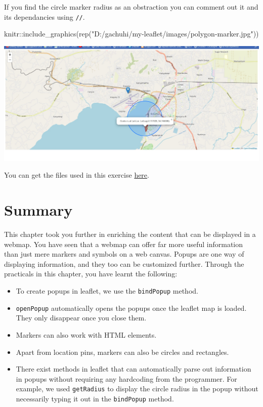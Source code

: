 \documentclass[
]{book}
\newenvironment{Shaded}{\begin{snugshade}}{\end{snugshade}}
\newcommand{\FunctionTok}[1]{\textcolor[rgb]{0.00,0.00,0.00}{#1}}
\newcommand{\NormalTok}[1]{#1}
\newcommand{\SpecialCharTok}[1]{\textcolor[rgb]{0.00,0.00,0.00}{#1}}
\newcommand{\StringTok}[1]{\textcolor[rgb]{0.31,0.60,0.02}{#1}}
\begin{document}
If you find the circle marker radius as an obstraction you can comment out it and its dependancies using \texttt{//}.

\begin{Shaded}
\begin{Highlighting}[]
\NormalTok{knitr}\SpecialCharTok{::}\FunctionTok{include\_graphics}\NormalTok{(}\FunctionTok{rep}\NormalTok{(}\StringTok{"D:/gachuhi/my{-}leaflet/images/polygon{-}marker.jpg"}\NormalTok{))}
\end{Highlighting}
\end{Shaded}

\includegraphics[width=26.67in]{../images/polygon-marker}

You can get the files used in this exercise \href{https://github.com/sammigachuhi/my-leaflet-project/tree/main/my-leaflet-code/chapter-3-markers}{here}.

\hypertarget{summary-2}{%
\section{Summary}\label{summary-2}}

This chapter took you further in enriching the content that can be displayed in a webmap. You have seen that a webmap can offer far more useful information than just mere markers and symbols on a web canvas. Popups are one way of displaying information, and they too can be customized further. Through the practicals in this chapter, you have learnt the following:

\begin{itemize}
\item
  To create popups in leaflet, we use the \texttt{bindPopup} method.
\item
  \texttt{openPopup} automatically opens the popups once the leaflet map is loaded. They only disappear once you close them.
\item
  Markers can also work with HTML elements.
\item
  Apart from location pins, markers can also be circles and rectangles.
\item
  There exist methods in leaflet that can automatically parse out information in popups without requiring any hardcoding from the programmer. For example, we used \texttt{getRadius} to display the circle radius in the popup without necessarily typing it out in the \texttt{bindPopup} method.
\end{itemize}
\end{document}

